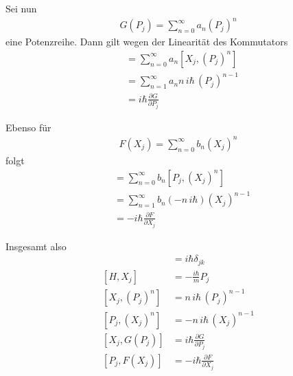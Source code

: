 \documentclass[11pt,a4paper]{scrartcl}
\begin{document}
\begin{enumerate}[label=(\alph*)]
\begin{tcolorbox}[title=Berechnung, breakable]
        Sei nun
        \begin{align*}
            G(P_j) = \sum\limits_{n=0}^{\infty} a_n (P_j)^n
        \end{align*}
        eine Potenzreihe. Dann gilt wegen der Linearität des Kommutators
        \begin{align*}
            [X_j,G(P_j)] &= \sum\limits_{n=0}^{\infty} a_n [X_j,(P_j)^n]\\
            &= \sum\limits_{n=1}^{\infty} a_n n\,i\hbar\,(P_j)^{n-1}\\
            &= i\hbar \frac{\partial G}{\partial P_j}
        \end{align*}

        Ebenso für
        \begin{align*}
            F(X_j) = \sum\limits_{n=0}^{\infty} b_n (X_j)^n
        \end{align*}
        folgt
        \begin{align*}
            [P_j,F(X_j)] &= \sum\limits_{n=0}^{\infty} b_n [P_j,(X_j)^n]\\
            &= \sum\limits_{n=1}^{\infty} b_n (-n\,i\hbar)(X_j)^{n-1}\\
            &= -i\hbar \frac{\partial F}{\partial X_j}
        \end{align*}

        Insgesamt also
        \begin{align*}
            [X_j,P_k] &= i\hbar \delta_{jk}\\
            [H,X_j] &= -\frac{i\hbar}{m}P_j\\
            [X_j,(P_j)^n] &= n\,i\hbar\,(P_j)^{n-1}\\
            [P_j,(X_j)^n] &= -n\,i\hbar\,(X_j)^{n-1}\\
            [X_j,G(P_j)] &= i\hbar \frac{\partial G}{\partial P_j}\\
            [P_j,F(X_j)] &= -i\hbar \frac{\partial F}{\partial X_j}
        \end{align*}
    \end{tcolorbox}


\end{enumerate}
\end{document}
